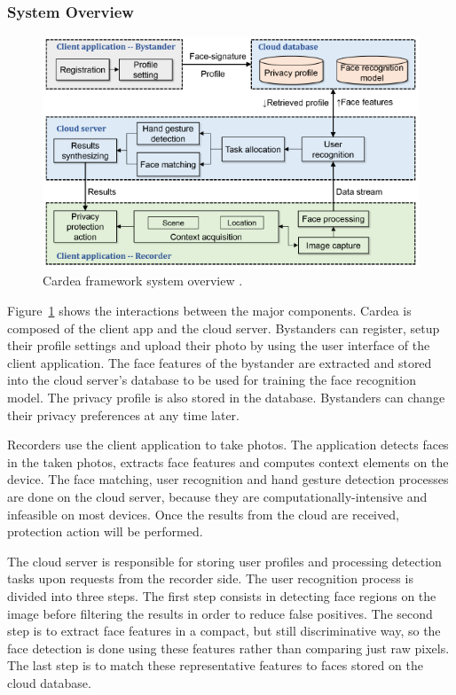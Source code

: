 \documentclass[conference]{IEEEtran}
\begin{document}
\subsubsection{System Overview}
\begin{figure}[t]
\centerline{\includegraphics[width=.5\textwidth]{img/cardea_overview_diagram.png}}
\caption{Cardea framework system overview \cite{shu2016cardea}.}
\label{fig:cardea2}
\end{figure}

Figure~\ref{fig:cardea2} shows the interactions between the major components. Cardea is composed of the client app and the cloud server. Bystanders can register, setup their profile settings and upload their photo by using the user interface of the client application. The face features of the bystander are extracted and stored into the cloud server's database to be used for training the face recognition model. The privacy profile is also stored in the database. Bystanders can change their privacy preferences at any time later. 

Recorders use the client application to take photos. The application detects faces in the taken photos, extracts face features and computes context elements on the device. The face matching, user recognition and hand gesture detection processes are done on the cloud server, because they are computationally-intensive and infeasible on most devices. Once the results from the cloud are received, protection action will be performed. 

The cloud server is responsible for storing user profiles and processing detection tasks upon requests from the recorder side. The user recognition process is divided into three steps. The first step consists in detecting face regions on the image before filtering the results in order to reduce false positives. The second step is to extract face features in a compact, but still discriminative way, so the face detection is done using these features rather than comparing just raw pixels. The last step is to match these representative features to faces stored on the cloud database. 
\end{document}
